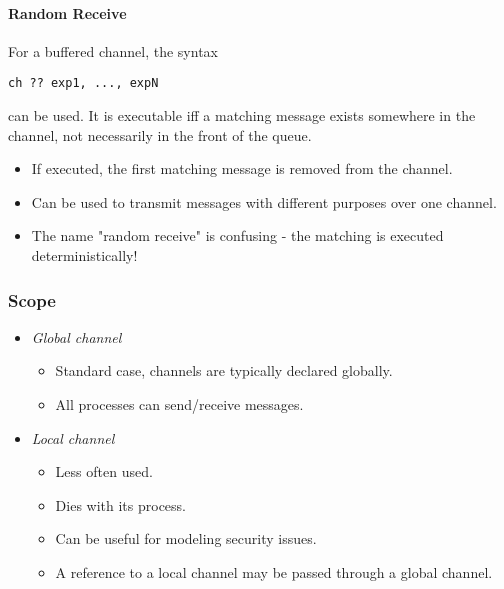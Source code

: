 \documentclass[a4paper, 11pt, accentcolor = tud3b]{tudreport}
\newcommand{\inlinePromela}[1]{\lstinline[language = PROMELA]|#1|}
\begin{document}
					\paragraph{Random Receive}
						For a buffered channel, the syntax
						\begin{center}
							\inlinePromela{ch ?? exp1, ..., expN}
						\end{center}
						can be used. It is executable iff a matching message exists somewhere in the channel, not necessarily in the front of the queue.
						\begin{itemize}
							\item If executed, the first matching message is removed from the channel.
							\item Can be used to transmit messages with different purposes over one channel.
							\item The name "random receive" is confusing - the matching is executed deterministically!
						\end{itemize}

				\subsubsection{Scope}
					\begin{itemize}
						\item \textit{Global channel}
							\begin{itemize}
								\item Standard case, channels are typically declared globally.
								\item All processes can send/receive messages.
							\end{itemize}
						\item \textit{Local channel}
							\begin{itemize}
								\item Less often used.
								\item Dies with its process.
								\item Can be useful for modeling security issues.
								\item A reference to a local channel may be passed through a global channel.
							\end{itemize}
					\end{itemize}
\end{document}
